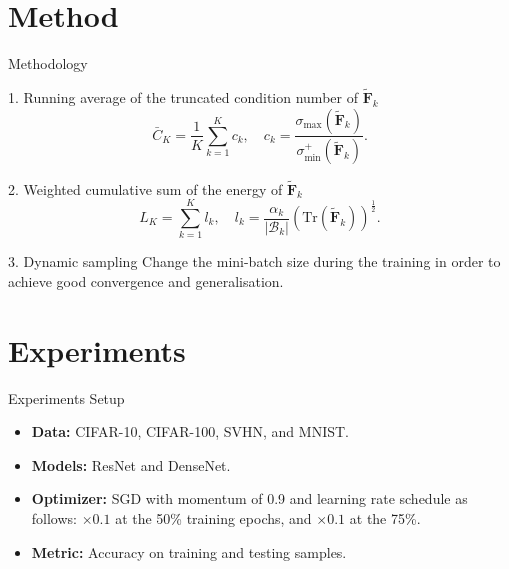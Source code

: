\documentclass{beamer}
\begin{document}
\section{Method}
\begin{frame}{Methodology}
    \begin{block}{1. Running average of the truncated condition number of $\widetilde{\mathbf{F}}_k$}
    \begin{equation}
    \bar{C}_K = \frac{1}{K}\sum_{k = 1}^K c_k, \quad c_k = \frac{\sigma_{\text{max}}(\widetilde{\mathbf{F}}_k)}{\sigma_{\text{min}}^+(\widetilde{\mathbf{F}}_k)}.
    \label{eq:cumsum_cond}
    \end{equation}
    \end{block}
    \begin{block}{2. Weighted cumulative sum of the energy of  $\widetilde{\mathbf{F}}_k$}
    \begin{equation}
    L_K  = \sum_{k = 1}^K l_k, \quad l_k  = \frac{\alpha_k}{|\mathcal{B}_k|} \left ( \mathrm{Tr} \left ( \widetilde{\mathbf{F}}_k \right ) \right )^{\frac{1}{2}}.
    \label{eq:cumsum_laplacian}
    \end{equation}
    \end{block}
    \begin{block}{3. Dynamic sampling}
    Change the mini-batch size during the training in order to achieve good convergence and generalisation.
    \end{block}
\end{frame}

\section{Experiments}
\begin{frame}{Experiments Setup}
    \begin{itemize}
        \item \textbf{Data:} CIFAR-10, CIFAR-100, SVHN, and MNIST.
        \item \textbf{Models:} ResNet and DenseNet.
        \item \textbf{Optimizer:} SGD with momentum of 0.9 and learning rate schedule as follows: $\times 0.1$ at the 50\% training epochs, and $\times 0.1$ at the 75\%.
        \item \textbf{Metric:} Accuracy on training and testing samples.
    \end{itemize}
\end{frame}
\end{document}
